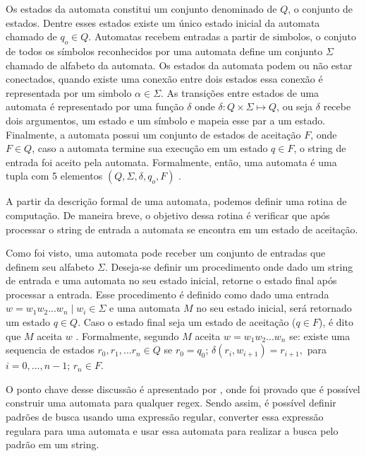 Os estados da automata constitui um conjunto denominado de $Q$, o conjunto de estados.
Dentre esses estados existe um único estado inicial da automata chamado de $q_o \in Q$.
Automatas recebem entradas a partir de simbolos, o conjuto de todos os símbolos reconhecidos por uma automata define um conjunto $\Sigma$ chamado de alfabeto da automata.
Os estados da automata podem ou não estar conectados, quando existe uma conexão entre dois estados essa conexão é representada por um simbolo $\alpha \in \Sigma$.
As transições entre estados de uma automata é representado por uma função $\delta$ onde $\delta : Q \times \Sigma \mapsto Q$, ou seja $\delta$ recebe dois argumentos, um estado e um símbolo e mapeia esse par a um estado.
Finalmente, a automata possui um conjunto de estados de aceitação $F$, onde $F \in Q$, caso a automata termine sua execução em um estado $q \in F$, o string de entrada foi aceito pela automata.
Formalmente, então, uma automata é uma tupla com 5 elementos $(Q, \Sigma, \delta, q_o, F)$ \cite{comp}.

A partir da descrição formal de uma automata, podemos definir uma rotina de computação.
De maneira breve, o objetivo dessa rotina é verificar que após processar o string de entrada a automata se encontra em um estado de aceitação.

Como foi visto, uma automata pode receber um conjunto de entradas que definem seu alfabeto $\Sigma$.
Deseja-se definir um procedimento onde dado um string de entrada e uma automata no seu estado inicial, retorne o estado final após processar a entrada.
Esse procedimento é definido como dado uma entrada $w=w_1w_2...w_n \mid w_i \in \Sigma$ e uma automata $M$ no seu estado inicial, será retornado um estado $q \in Q$.
Caso o estado final seja um estado de aceitação ($q \in F$), é dito que $M$ aceita $w$ \cite{comp}.
Formalmente, segundo \cite{comp} $M$ aceita $w = w_1w_2...w_n$ se: existe uma sequencia de estados $r_0, r_1, ... r_n \in Q$ se $r_0 = q_0$; $\delta(r_i, w_{i+1}) = r_{i+1},$ para $i = 0, ..., n-1$; $r_n \in F$.

O ponto chave desse discussão é apresentado por \cite{comp}, onde foi provado que é possível construir uma automata para qualquer regex.
Sendo assim, é possível definir padrões de busca usando uma expressão regular, converter essa expressão regulara para uma automata e usar essa automata para realizar a busca pelo padrão em um string.


